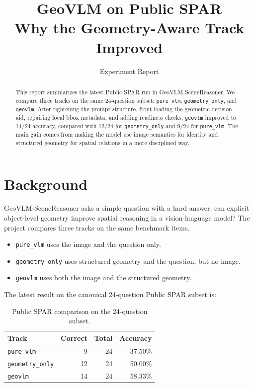 \documentclass[11pt]{article}
\title{\textbf{GeoVLM on Public SPAR}\\
\large Why the Geometry-Aware Track Improved}
\author{Experiment Report}
\date{}
\newcommand{\track}[1]{\texttt{#1}}
\begin{document}
\maketitle

\begin{abstract}
This report summarizes the latest Public SPAR run in GeoVLM-SceneReasoner. We compare three tracks on the same 24-question subset: \track{pure\_vlm}, \track{geometry\_only}, and \track{geovlm}. After tightening the prompt structure, front-loading the geometric decision aid, repairing local bbox metadata, and adding readiness checks, \track{geovlm} improved to 14/24 accuracy, compared with 12/24 for \track{geometry\_only} and 9/24 for \track{pure\_vlm}. The main gain comes from making the model use image semantics for identity and structured geometry for spatial relations in a more disciplined way.
\end{abstract}

\section{Background}

GeoVLM-SceneReasoner asks a simple question with a hard answer: can explicit object-level geometry improve spatial reasoning in a vision-language model? The project compares three tracks on the same benchmark items.

\begin{itemize}[leftmargin=18pt,itemsep=1pt]
    \item \track{pure\_vlm} uses the image and the question only.
    \item \track{geometry\_only} uses structured geometry and the question, but no image.
    \item \track{geovlm} uses both the image and the structured geometry.
\end{itemize}

The latest result on the canonical 24-question Public SPAR subset is:

\begin{table}[H]
\centering
\caption{Public SPAR comparison on the 24-question subset.}
\begin{tabular}{lrrr}
\toprule
\textbf{Track} & \textbf{Correct} & \textbf{Total} & \textbf{Accuracy} \\
\midrule
\track{pure\_vlm} & 9 & 24 & 37.50\% \\
\track{geometry\_only} & 12 & 24 & 50.00\% \\
\track{geovlm} & 14 & 24 & 58.33\% \\
\bottomrule
\end{tabular}
\end{table}
\end{document}
